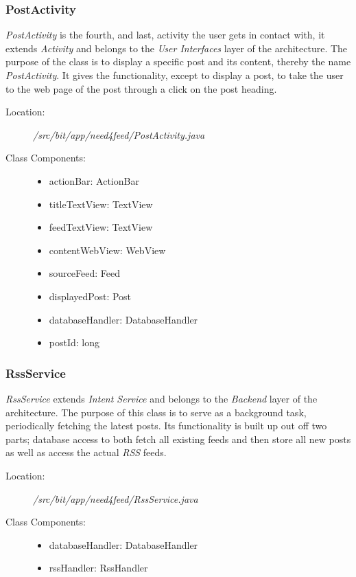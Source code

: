 \subsubsection{PostActivity}
\textit{PostActivity} is the fourth, and last, activity the user gets in contact with, it extends \textit{Activity} and belongs to the \textit{User Interfaces} layer of the architecture. The purpose of the class is to display a specific post and its content, thereby the name \textit{PostActivity}. It gives the functionality, except to display a post, to take the user to the web page of the post through a click on the post heading.
\begin{description}
  \item[Location:] \textit{/src/bit/app/need4feed/PostActivity.java} \hfill
  \item[Class Components:] \hfill
     \begin{itemize}
        \item actionBar: ActionBar
        \item titleTextView: TextView
        \item feedTextView: TextView
        \item contentWebView: WebView
        \item sourceFeed: Feed
        \item displayedPost: Post
        \item databaseHandler: DatabaseHandler
        \item postId: long
     \end{itemize}
\end{description}

	
\subsubsection{RssService}
\textit{RssService} extends \textit{Intent Service} and belongs to the \textit{Backend} layer of the architecture. The purpose of this class is to serve as a background task, periodically fetching the latest posts. Its functionality is built up out off two parts; database access to both fetch all existing feeds and then store all new posts as well as access the actual \textit{RSS} feeds.
\begin{description}
  \item[Location:] \textit{/src/bit/app/need4feed/RssService.java} \hfill
  \item[Class Components:] \hfill
     \begin{itemize}
        \item databaseHandler: DatabaseHandler
        \item rssHandler: RssHandler
     \end{itemize}
\end{description}


